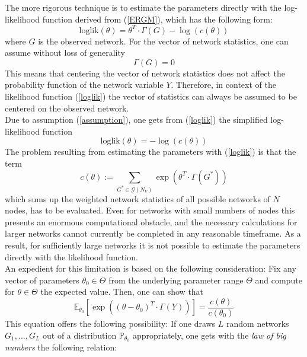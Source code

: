\documentclass[10pt, conference, compsocconf]{IEEEtran}
\begin{document}
The more rigorous technique is to estimate the parameters directly with the log-likelihood function derived from (\ref{ERGM}), which has the following form:
%
\begin{equation}
\text{loglik}(\theta)=\theta^T \cdot \Gamma(G)-\log(c(\theta))
\label{loglik}
\end{equation}
%
where $G$ is the observed network. For the vector of network statistics, one can assume without loss of generality
%
\begin{equation}
\Gamma(G)=0 \label{assumption}
\end{equation}
%
This means that centering the vector of network statistics does not affect the probability function of the network variable $Y$. Therefore, in context of the likelihood function (\ref{loglik}) the vector of statistics can always be assumed to be centered on the observed network.\\
Due to assumption (\ref{assumption}), one gets from (\ref{loglik}) the simplified log-likelihood function
%
\begin{equation}
\text{loglik}(\theta)= -\log(c(\theta))
\label{vloglik}
\end{equation}
%
The problem resulting from estimating the parameters with (\ref{loglik}) is that the term
%
$$c(\theta):= \sum_{G^* \in \mathcal{G}(N_V)} \exp(\theta^T \cdot \Gamma(G^*))$$ 
%
which sums up the weighted network statistics of all possible networks of $N$ nodes, has to be evaluated. Even for networks with small numbers of nodes this presents an enormous computational obstacle, and the necessary calculations for larger networks cannot currently be completed in any reasonable timeframe.
As a result, for sufficiently large networks it is not possible to estimate the parameters directly with the likelihood function.
\\[0.3cm]
An expedient for this limitation is based on the following consideration: Fix any vector of parameters $\theta_0 \in \Theta$ from the underlying parameter range $\Theta$ and compute for $\theta \in \Theta$ the expected value. Then, one can show that
%
\begin{equation*}
\mathbb{E}_{\theta_0}\left[ \exp\left((\theta - \theta_0)^T \cdot \Gamma(Y)\right) \right]=\frac{c(\theta)}{c(\theta_0)}
\end{equation*}
%
This equation offers the following possibility: If one draws $L$ random networks $G_1, \dots ,G_L$ out of a distribution $\mathbb{P}_{\theta_0}$ appropriately, one gets with the \textit{law of big numbers} the following relation:
\end{document}
